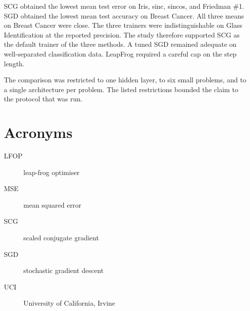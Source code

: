 \documentclass[conference,10pt]{IEEEtran}
\begin{document}
SCG obtained the lowest mean test error on Iris, sinc, sincos, and Friedman \#1.
SGD obtained the lowest mean test accuracy on Breast Cancer.
All three means on Breast Cancer were close.
The three trainers were indistinguishable on Glass Identification at the reported precision.
The study therefore supported SCG as the default trainer of the three methods.
A tuned SGD remained adequate on well-separated classification data.
LeapFrog required a careful cap on the step length.

The comparison was restricted to one hidden layer, to six small problems, and to a single architecture per problem.
The listed restrictions bounded the claim to the protocol that was run.




\appendix
\section{Acronyms}
\begin{description}
\item[LFOP] leap-frog optimiser
\item[MSE] mean squared error
\item[SCG] scaled conjugate gradient
\item[SGD] stochastic gradient descent
\item[UCI] University of California, Irvine
\end{description}
\end{document}
